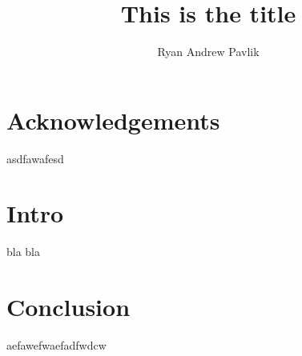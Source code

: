 \documentclass[capstoc,capschap,draftcls]{rpisudiss}
\title{This is the title}
\author{Ryan Andrew Pavlik}
\begin{document}
\maketitle

\tableofcontents{}
\listoffigures
\listoftables

\chapter{Acknowledgements}
asdfawafesd


\chapter{Intro}
bla bla


\chapter{Conclusion}

aefawefwaefadfwdcw
\end{document}
